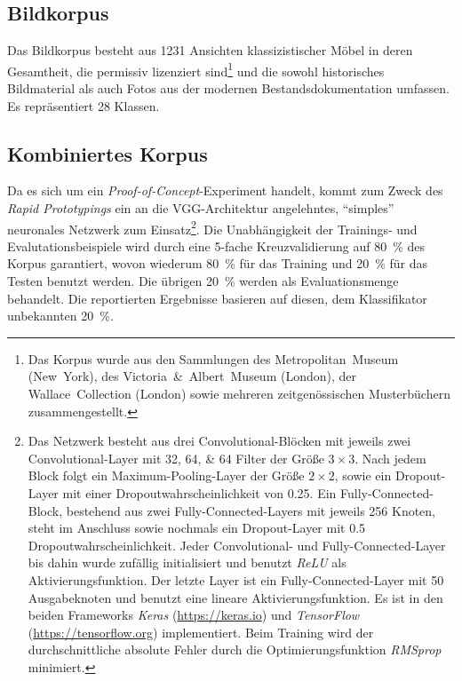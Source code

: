 \subsection{Bildkorpus}
Das Bildkorpus besteht aus \num{1231} Ansichten klassizistischer Möbel in deren Gesamtheit, die permissiv lizenziert sind\footnote{Das Korpus wurde aus den Sammlungen des Metropolitan~Museum (New~York), des Victoria~\&~Albert~Museum (London), der Wallace~Collection (London) sowie mehreren zeitgenössischen Musterbüchern zusammengestellt.} und die sowohl historisches Bildmaterial als auch Fotos aus der modernen Bestandsdokumentation umfassen. Es repräsentiert 28 Klassen.


\subsection{Kombiniertes Korpus}
Da es sich um ein \emph{Proof-of-Concept}-Experiment handelt, kommt zum Zweck des \emph{Rapid Prototypings} ein an die VGG-Architektur \parencite{krizhevsky_ImageNetClassificationDeepConvolutionalNeural_2012a} angelehntes, \enquote{simples} neuronales Netzwerk zum Einsatz\footnote{Das Netzwerk besteht aus drei Convolutional-Blöcken mit jeweils zwei Convolutional-Layer mit \numlist{32;64;64} Filter der Größe $ 3 \times 3 $. Nach jedem Block folgt ein Maximum-Pooling-Layer der Größe $ 2 \times 2 $, sowie ein Dropout-Layer mit einer Dropoutwahrscheinlichkeit von \num{0.25}. Ein Fully-Connected-Block, bestehend aus zwei Fully-Connected-Layers mit jeweils 256 Knoten, steht im Anschluss sowie nochmals ein Dropout-Layer mit \num{0.5} Dropoutwahrscheinlichkeit. Jeder Convolutional- und Fully-Connected-Layer bis dahin wurde zufällig initialisiert und benutzt \emph{ReLU} als Aktivierungsfunktion. Der letzte Layer ist ein Fully-Connected-Layer mit 50 Ausgabeknoten und benutzt eine lineare Aktivierungsfunktion. Es ist in den beiden Frameworks \emph{Keras} (\url{https://keras.io}) und \emph{TensorFlow} (\url{https://tensorflow.org}) implementiert. Beim Training wird der durchschnittliche absolute Fehler durch die Optimierungsfunktion \emph{RMSprop} minimiert.}.
Die Unabhängigkeit der Trainings- und Evalutationsbeispiele wird durch eine \mbox{5-fache} Kreuzvalidierung auf \SI{80}{\percent} des Korpus garantiert, wovon wiederum \SI{80}{\percent} für das Training und \SI{20}{\percent} für das Testen benutzt werden. Die übrigen \SI{20}{\percent} werden als Evaluationsmenge behandelt. Die reportierten Ergebnisse basieren auf diesen, dem Klassifikator unbekannten \SI{20}{\percent}. 

